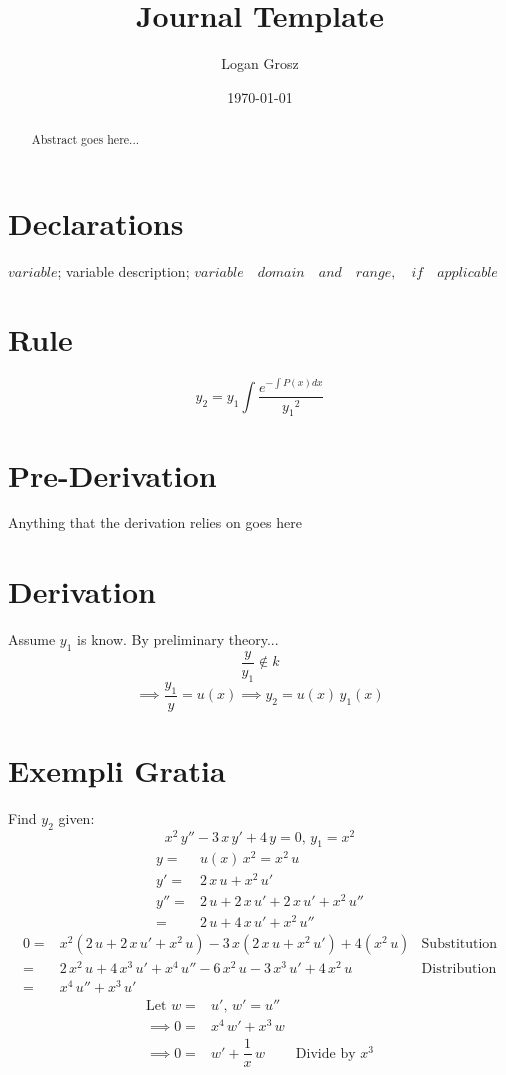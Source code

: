 \documentclass{article}
\begin{document}
	
\author{Logan Grosz}
\title{Journal Template}
\date{\today}

\maketitle

\begin{abstract}
	Abstract goes here...
\end{abstract}

\section{Declarations}

$variable$; variable description; $variable\quad domain\quad and\quad range,\quad if\quad applicable$

\section{Rule}

$$y_2=y_1\int{\dfrac{e^{-\int P(x)dx}}{{y_1}^2}}$$

\section{Pre-Derivation}
Anything that the derivation relies on goes here

\section{Derivation}

Assume $y_1$ is know. By preliminary theory...
$$\dfrac{y}{y_1}\notin k$$
$$\implies \dfrac{y_1}{y}=u(x)\implies y_2=u(x)\,y_1(x)$$

\section{Exempli Gratia}

Find $y_2$ given:
\begin{equation*}
	x^2\,y''-3\,x\,y'+4\,y=0,\,y_1=x^2
\end{equation*}
\begin{align*}
	y=&u(x)\,x^2=x^2\,u\\
	y'=&2\,x\,u+x^2\,u'\\
	y''=&2\,u+2\,x\,u'+2\,x\,u'+x^2\,u''\\
	   =&2\,u+4\,x\,u'+x^2\,u''
\end{align*}
\begin{align*}
	0=&x^2(2\,u+2\,x\,u'+x^2\,u)-3\,x(2\,x\,u+x^2\,u')+4(x^2\,u)&\text{Substitution}\\
	 =&2\,x^2\,u+4\,x^3\,u'+x^4\,u''-6\,x^2\,u-3\,x^3\,u'+4\,x^2\,u&\text{Distribution}\\
	 =&x^4\,u''+x^3\,u'
\end{align*}
\begin{align*}
	\text{Let }w=&u',\,w'=u''&\\
	\implies 0=&x^4\,w'+x^3\,w\\
	\implies 0=&w'+\dfrac{1}{x}\,w &\text{Divide by }x^3
\end{align*}
\end{document}
